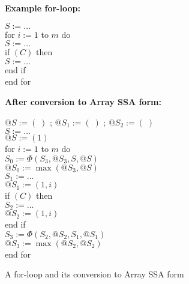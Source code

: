 \begin{figure}%
\begin{center}
\parbox{3.0in}{
{\bf Example for-loop:}

\begin{programa}
\Ta  $S := \ldots$ \\
\Ta  for $i := 1$ to $m$ do  \\
\Tb  $S := \ldots$ \\
\Tb  if $(C)$ then  \\
\Tc  $S := \ldots$   \\
\Tb  end if \\
\Ta end for
\end{programa}

\vspace{24pt}

{\bf After conversion to Array SSA form:}

\begin{programa}
\Ta $@S := (\;)$ ; $@S_1 := (\;)$ ; $@S_2 := (\;)$\\
\Ta  $S := \ldots $\\
\Ta   $@S := (1)$ \\
\Ta  for $i := 1$ to $m$ do  \\
\Tb  $S_0 := \Phi (S_3, @S_3, S, @S)$ \\
\Tb  $@S_0 := \max(@S_3, @S)$ \\
\Tb  $S_1 := \ldots$   \\
\Tb   $@S_1 := (1,i)$ \\
\Tb  if $(C)$ then  \\
\Tc  $S_2 := \ldots$  \\
\Tc  $@S_2 := (1,i)$  \\
\Tb  end if \\
\Tb  $S_3 := \Phi (S_2, @S_2, S_1, @S_1)$ \\
\Tb  $@S_3 := \max(@S_2, @S_2)$ \\
\Ta end for
\end{programa}
}
\end{center}
\caption{A for-loop and its conversion to Array SSA form}
\label{fig:for}
\end{figure}

